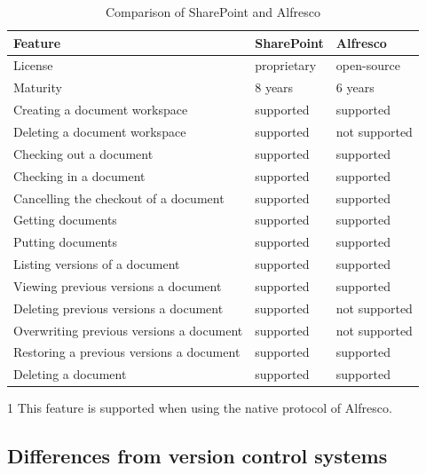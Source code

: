 \begin{table}[H]
\begin{threeparttable}
  \begin{center}
    \begin{tabular}{| l | l | l |}
    \hline
    \textbf{Feature} & \textbf{SharePoint} & \textbf{Alfresco} \\ \hline
    License & proprietary & open-source \\ \hline
    Maturity & 8 years \cite{sphist} & 6 years \\ \hline
    Creating a document workspace & supported & supported \\ \hline
    Deleting a document workspace & supported & not supported\tnote{1}\\ \hline
    Checking out a document & supported & supported \\ \hline
    Checking in a document & supported & supported \\ \hline
    Cancelling the checkout of a document & supported & supported \\ \hline
    Getting documents & supported & supported \\ \hline
    Putting documents & supported & supported \\ \hline
    Listing versions of a document & supported & supported \\ \hline
    Viewing previous versions a document & supported & supported \\ \hline
    Deleting previous versions a document & supported & not supported \\ \hline
    Overwriting previous versions a document & supported & not supported \\ \hline
    Restoring a previous versions a document & supported & supported \\ \hline
    Deleting a document & supported & supported \\ \hline
    \end{tabular}
    \begin{tablenotes}
    \item [1] This feature is supported when using the native protocol of Alfresco.
    \end{tablenotes}
  \end{center}
  \caption{Comparison of SharePoint and Alfresco}
  \label{tab:background-comparison}
\end{threeparttable}
\end{table}

\subsection{Differences from version control systems}

